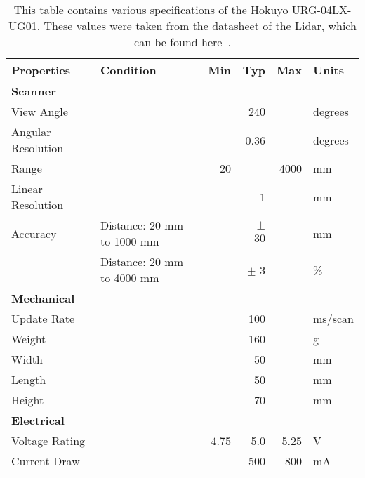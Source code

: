 \begin{table}
\centering
\begin{tabulary}{\textwidth}{|l||l|r|r|r|l|}
\hline
\textbf{Properties}& \textbf{Condition}         & \textbf{Min} & \textbf{Typ} & \textbf{Max} & \textbf{Units} \\	\hline\hline
\textbf{Scanner}   &                            &              &              &              &                \\	\hline
View Angle 	       &                            &              & 240          &              & degrees        \\	\hline
Angular Resolution &                            &              & 0.36         &              & degrees        \\	\hline
Range 	           &                            & 20           &              & 4000         & mm             \\	\hline 
Linear Resolution  &                            &              & 1            &              & mm             \\	\hline 
Accuracy           & Distance: 20 mm to 1000 mm &              & $\pm$ 30     &              & mm             \\	\hline 
        	       & Distance: 20 mm to 4000 mm &              & $\pm$ 3      &              & \%             \\	\hline \hline 
\textbf{Mechanical}&                            &              &              &              &                \\	\hline
Update Rate	       &                            &              & 100          &              & ms/scan        \\	\hline 
Weight             &                            &              & 160          &              & g              \\	\hline 
Width              &                            &              & 50           &              & mm             \\	\hline 
Length             &                            &              & 50           &              & mm             \\	\hline 
Height             &                            &              & 70           &              & mm             \\	\hline \hline
\textbf{Electrical}&                            &              &              &              &                \\	\hline 
Voltage Rating     &                            & 4.75         & 5.0          & 5.25         & V              \\	\hline 
Current Draw       &                            &              & 500          & 800          & mA             \\	\hline 
\end{tabulary} 
\caption{This table contains various specifications of the Hokuyo URG-04LX-UG01.
         These values were taken from the datasheet of the Lidar, which can be found here~\cite{urg_specs}.}
\label{tab:lidar_params1}
\end{table}

